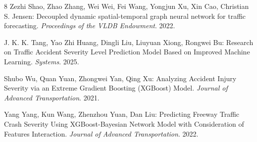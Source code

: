 \documentclass[runningheads]{llncs}
\begin{document}
\begin{thebibliography}{8}
Zezhi Shao, Zhao Zhang, Wei Wei, Fei Wang, Yongjun Xu, Xin Cao, Christian S. Jensen: Decoupled dynamic spatial-temporal graph neural network for traffic forecasting. \textit{Proceedings of the VLDB Endowment}. 2022. 

J. K. K. Tang, Yao Zhi Huang, Dingli Liu, Liuyuan Xiong, Rongwei Bu: Research on Traffic Accident Severity Level Prediction Model Based on Improved Machine Learning. \textit{Systems}. 2025. 

Shubo Wu, Quan Yuan, Zhongwei Yan, Qing Xu: Analyzing Accident Injury Severity via an Extreme Gradient Boosting (XGBoost) Model. \textit{Journal of Advanced Transportation}. 2021. 

Yang Yang, Kun Wang, Zhenzhou Yuan, Dan Liu: Predicting Freeway Traffic Crash Severity Using XGBoost-Bayesian Network Model with Consideration of Features Interaction. \textit{Journal of Advanced Transportation}. 2022. 

\end{thebibliography}
\end{document}
